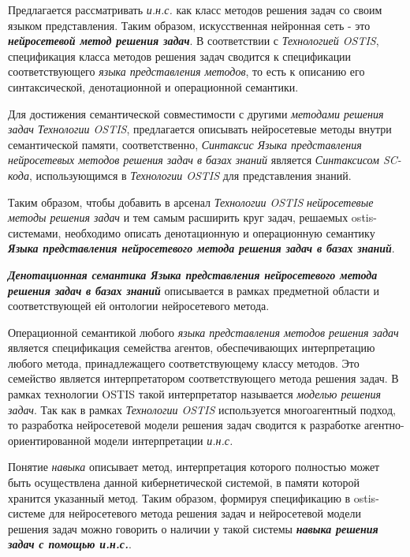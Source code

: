 Предлагается рассматривать \textit{и.н.с.} как класс методов решения задач со своим языком представления. Таким образом, искусственная нейронная сеть - это \textbf{\textit{нейросетевой метод решения задач}}. В соответствии с \textit{Технологией OSTIS}, спецификация класса методов решения задач сводится к спецификации соответствующего \textit{языка представления методов}, то есть к описанию его синтаксической, денотационной и операционной семантики.

Для достижения семантической совместимости с другими \textit{методами решения задач} \textit{Технологии OSTIS}, предлагается описывать нейросетевые методы внутри семантической памяти, соответственно, \textit{Синтаксис Языка представления \textit{нейросетевых методов решения задач в базах знаний}} является \textit{Синтаксисом SC-кода}, использующимся в \textit{Технологии OSTIS} для представления знаний.

Таким образом, чтобы добавить в арсенал \textit{Технологии OSTIS} \textit{нейросетевые методы решения задач} и тем самым расширить круг задач, решаемых ostis-системами, необходимо описать денотационную и операционную семантику \textbf{\textit{Языка представления нейросетевого метода решения задач в базах знаний}}.

\textbf{\textit{Денотационная семантика Языка представления нейросетевого метода решения задач в базах знаний}} описывается в рамках предметной области и соответствующей ей онтологии нейросетевого метода.

Операционной семантикой любого \textit{языка представления методов решения задач} является спецификация семейства агентов, обеспечивающих интерпретацию любого метода, принадлежащего соответствующему классу методов. Это семейство является интерпретатором соответствующего метода решения задач. В рамках технологии OSTIS такой интерпретатор называется \textit{моделью решения задач}. Так как в рамках \textit{Технологии OSTIS} используется многоагентный подход, то разработка нейросетевой модели решения задач сводится к разработке агентно-ориентированной модели интерпретации \textit{и.н.с.}

Понятие \textit{навыка} описывает метод, интерпретация которого полностью может быть осуществлена данной кибернетической системой, в памяти которой хранится указанный метод. Таким образом, формируя спецификацию в ostis-системе для нейросетевого метода решения задач и нейросетевой модели решения задач можно говорить о наличии у такой системы \textbf{\textit{навыка решения задач с помощью и.н.с.}}.

